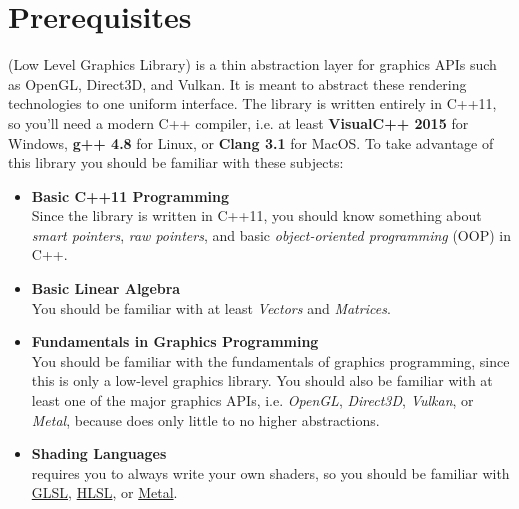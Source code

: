 \documentclass{article}
\begin{document}

\newpage
\section{Prerequisites}

\LLGL (Low Level Graphics Library) is a thin abstraction layer for graphics APIs such as
OpenGL, Direct3D, and Vulkan. It is meant to abstract these rendering technologies to one uniform interface.
The library is written entirely in C++11, so you'll
need a modern C++ compiler, i.e. at least \textbf{VisualC++ 2015} for Windows,
\textbf{g++ 4.8} for Linux, or \textbf{Clang 3.1} for MacOS.
To take advantage of this library you should be familiar with these subjects:
\begin{itemize}
	\item \textbf{Basic C++11 Programming} \\
	Since the library is written in C++11, you should know something about \emph{smart pointers},
	\emph{raw pointers}, and basic \emph{object-oriented programming} (OOP) in C++.
	
	\item \textbf{Basic Linear Algebra} \\
	You should be familiar with at least \emph{Vectors} and \emph{Matrices}.
	
	\item \textbf{Fundamentals in Graphics Programming} \\
	You should be familiar with the fundamentals of graphics programming, since this is only a low-level graphics library.
	You should also be familiar with at least one of the major graphics APIs,
	i.e. \emph{OpenGL}, \emph{Direct3D}, \emph{Vulkan}, or \emph{Metal},
	because \LLGL does only little to no higher abstractions.
	
	\item \textbf{Shading Languages} \\
	\LLGL requires you to always write your own shaders, so you should be familiar with
	\href{https://www.khronos.org/opengl/wiki/OpenGL_Shading_Language}{GLSL},
	\href{https://docs.microsoft.com/en-us/windows/desktop/direct3dhlsl/dx-graphics-hlsl}{HLSL},
	or \href{https://developer.apple.com/metal/Metal-Shading-Language-Specification.pdf}{Metal}.
\end{itemize}
\end{document}
